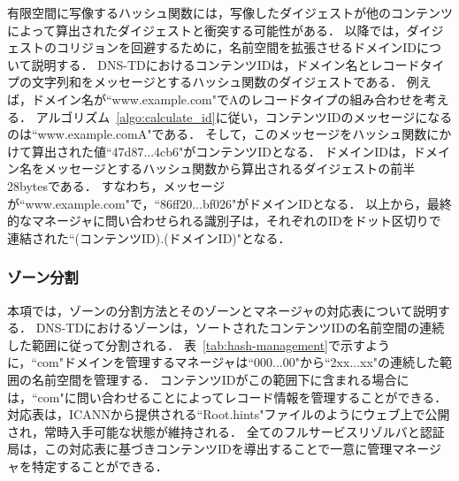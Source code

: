 有限空間に写像するハッシュ関数には，写像したダイジェストが他のコンテンツによって算出されたダイジェストと衝突する可能性がある．
以降では，ダイジェストのコリジョンを回避するために，名前空間を拡張させるドメインIDについて説明する．
DNS-TDにおけるコンテンツIDは，ドメイン名とレコードタイプの文字列和をメッセージとするハッシュ関数のダイジェストである．
例えば，ドメイン名が``www.example.com"でAのレコードタイプの組み合わせを考える．
アルゴリズム~\ref{algo:calculate_id}に従い，コンテンツIDのメッセージになるのは``www.example.comA"である．
そして，このメッセージをハッシュ関数にかけて算出された値``47d87...4cb6"がコンテンツIDとなる．
ドメインIDは，ドメイン名をメッセージとするハッシュ関数から算出されるダイジェストの前半28bytesである．
すなわち，メッセージが``www.example.com"で，``86ff20...bf026"がドメインIDとなる．
以上から，最終的なマネージャに問い合わせられる識別子は，それぞれのIDをドット区切りで連結された``(コンテンツID).(ドメインID)"となる．


\subsubsection{ゾーン分割}
本項では，ゾーンの分割方法とそのゾーンとマネージャの対応表について説明する．
DNS-TDにおけるゾーンは，ソートされたコンテンツIDの名前空間の連続した範囲に従って分割される．
表~\ref{tab:hash-management}で示すように，``com"ドメインを管理するマネージャは``000...00"から``2xx...xx"の連続した範囲の名前空間を管理する．
コンテンツIDがこの範囲下に含まれる場合には，``com"に問い合わせることによってレコード情報を管理することができる．
対応表は，ICANNから提供される``Root.hints"ファイルのようにウェブ上で公開され，常時入手可能な状態が維持される．
全てのフルサービスリゾルバと認証局は，この対応表に基づきコンテンツIDを導出することで一意に管理マネージャを特定することができる．


